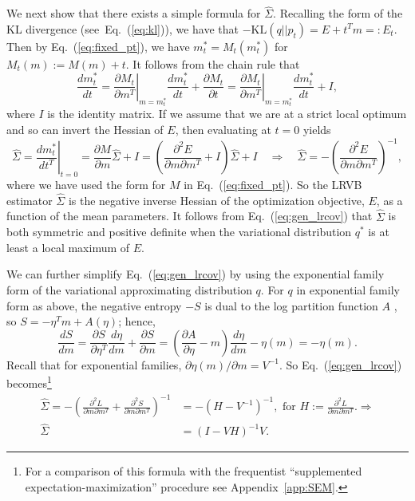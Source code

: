 \documentclass{article}\usepackage[]{graphicx}\usepackage[]{color}
\newcommand{\app}[1]{Appendix~\ref{app:#1}}
\newcommand{\eq}[1]{Eq.~(\ref{eq:#1})}
\newcommand{\npq}{\eta} %
\newcommand{\mpq}{m} %
\newcommand{\mpopt}{m^*} %
\newcommand{\lrcov}{\hat{\Sigma}} %
\newcommand{\klshort}{E}
\newcommand{\kl}{\textrm{KL}}
\begin{document}
We next show that there exists a simple formula for $\lrcov$.
Recalling the form of the KL divergence (see~\eq{kl}), we have that
$-\kl(q || p_t) = E + t^{T} m =: E_t$. Then by \eq{fixed_pt}, we have
$\mpopt_t = M_t(\mpopt_t)$ for $M_t(\mpq) := M(\mpq) + t$. It follows from
the chain rule that
\begin{equation}\label{eq:dM_dt}
  \frac{d\mpq^*_t}{dt}
    = \left. \frac{\partial M_t}{\partial \mpq^T} \right|_{\mpq = \mpopt_t}
      \frac{d\mpopt_t}{dt} + \frac{\partial M_t}{\partial t}
    = \left. \frac{\partial M_t}{\partial \mpq^T} \right|_{\mpq = \mpopt_t}
      \frac{d\mpopt_t}{dt} + I,
\end{equation}
where $I$ is the identity matrix.  If we assume that we are at a strict local
optimum and so can invert the Hessian of $E$, then evaluating at $t=0$ yields
%
\begin{equation}
  \label{eq:gen_lrcov}
  \lrcov = \left. \frac{d\mpq^*_t}{dt^T} \right|_{t=0} = \frac{\partial M}{\partial \mpq} \lrcov + I
    = \left(\frac{\partial^2 \klshort}{\partial \mpq \partial \mpq^T} + I \right) \lrcov + I
    \quad
    \Rightarrow
    \quad
    \lrcov = -\left(\frac{\partial^2 \klshort}{\partial \mpq \partial \mpq^T} \right)^{-1},
\end{equation}
%
where we have used the form for $M$ in \eq{fixed_pt}. So the LRVB estimator
$\lrcov$ is the negative inverse Hessian of the optimization objective, $E$, as
a function of the mean parameters. It follows from \eq{gen_lrcov} that $\lrcov$
is both symmetric and positive definite when the variational distribution
$q^{*}$ is at least a local maximum of $E$.

We can further simplify \eq{gen_lrcov} by using the exponential family form of
the variational approximating distribution $q$. For $q$ in exponential family
form as above, the negative entropy $-S$ is dual to the log partition function
$A$ \citep{wainwright2008graphical}, so $S = -\npq^T \mpq + A(\npq)$; hence,
%
$$
  \frac{dS}{dm}
    = \frac{\partial S}{\partial \npq^T} \frac{d\npq}{d\mpq} + \frac{\partial S}{\partial \mpq}
    = \left(\frac{\partial A}{\partial \npq} - \mpq \right) \frac{d\npq}{d\mpq} - \npq(\mpq)
    = - \npq(\mpq).
$$
%
Recall that for exponential families, $\partial \npq(\mpq) / \partial \mpq =
V^{-1}$. So \eq{gen_lrcov} becomes\footnote{For a comparison of this formula
with the frequentist ``supplemented expectation-maximization'' procedure see
\app{SEM}.}
%
\begin{align}
  \nonumber
  \lrcov = -\left(\frac{\partial^2 L}{\partial m \partial m^T} + \frac{\partial^2 S}{\partial m \partial m^T}\right)^{-1}
    &= -(H - V^{-1})^{-1}, \textrm{ for } H := \frac{\partial^2 L}{\partial m \partial m^T}.  \Rightarrow\\
  \label{eq:spec_lrvb}
  \lrcov &= (I - VH)^{-1} V.
\end{align}
\end{document}
